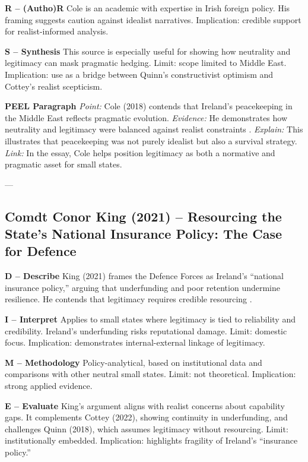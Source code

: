 \textbf{R – (Autho)R}  
Cole is an academic with expertise in Irish foreign policy. His framing suggests caution against idealist narratives. Implication: credible support for realist-informed analysis.

\textbf{S – Synthesis}  
This source is especially useful for showing how neutrality and legitimacy can mask pragmatic hedging. Limit: scope limited to Middle East. Implication: use as a bridge between Quinn’s constructivist optimism and Cottey’s realist scepticism.

\textbf{PEEL Paragraph}  
\textit{Point:} Cole (2018) contends that Ireland’s peacekeeping in the Middle East reflects pragmatic evolution.  
\textit{Evidence:} He demonstrates how neutrality and legitimacy were balanced against realist constraints \parencite{COLE_2018}.  
\textit{Explain:} This illustrates that peacekeeping was not purely idealist but also a survival strategy.  
\textit{Link:} In the essay, Cole helps position legitimacy as both a normative and pragmatic asset for small states.  

---

\subsection*{Comdt Conor King (2021) – Resourcing the State’s National Insurance Policy: The Case for Defence}

\textbf{D – Describe}  
King (2021) frames the Defence Forces as Ireland’s “national insurance policy,” arguing that underfunding and poor retention undermine resilience. He contends that legitimacy requires credible resourcing \parencite{KING_2021}.

\textbf{I – Interpret}  
Applies to small states where legitimacy is tied to reliability and credibility. Ireland’s underfunding risks reputational damage. Limit: domestic focus. Implication: demonstrates internal-external linkage of legitimacy.

\textbf{M – Methodology}  
Policy-analytical, based on institutional data and comparisons with other neutral small states. Limit: not theoretical. Implication: strong applied evidence.

\textbf{E – Evaluate}  
King’s argument aligns with realist concerns about capability gaps. It complements Cottey (2022), showing continuity in underfunding, and challenges Quinn (2018), which assumes legitimacy without resourcing. Limit: institutionally embedded. Implication: highlights fragility of Ireland’s “insurance policy.”

